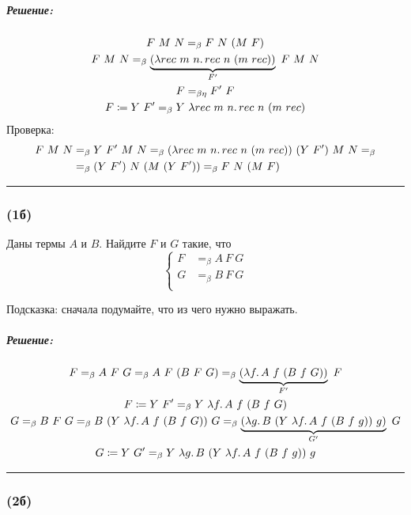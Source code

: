 \documentclass{article}
\newenvironment{proof}{\subparagraph{\hspace{-1em}Решение:\newline}\-}{\par\noindent\rule{\textwidth}{0.4pt}}
\newcommand{\eqbeta}{=_\beta}
\newcommand{\eqbetaeta}{=_{\beta\eta}}
\begin{document}
    \begin{proof}
        \begin{gather}
            F~M~N \eqbeta F~N~(M~F) \\
            F~M~N \eqbeta \underbrace{(\lambda rec~m~n\ldotp rec~n~(m~rec))}_{F'}~F~M~N \\
            F \eqbetaeta F'~F \\
            F \coloneqq Y~F' \eqbeta Y~\lambda rec~m~n\ldotp rec~n~(m~rec)
        \end{gather}
        Проверка:
        \begin{align}
            F~M~N & \eqbeta Y~F'~M~N \eqbeta (\lambda rec~m~n\ldotp rec~n~(m~rec))~(Y~F')~M~N \eqbeta \\
                  & \eqbeta (Y~F')~N~(M~(Y~F')) \eqbeta F~N~(M~F)
        \end{align}
    \end{proof}

    \subsubsection{(1б)}

    Даны термы $A$ и $B$.
    Найдите $F$ и $G$ такие, что
    \[
        \left\{
        \begin{aligned}
            F &\eqbeta A~F~G \\
            G &\eqbeta B~F~G \\
        \end{aligned}\right.
    \]

    Подсказка: сначала подумайте, что из чего нужно выражать.

    \begin{proof}
        \begin{gather}
            F \eqbeta A~F~G \eqbeta A~F~(B~F~G) \eqbeta \underbrace{(\lambda f\ldotp A~f~(B~f~G))}_{F'}~F \\
            F \coloneqq Y~F' \eqbeta Y~\lambda f\ldotp A~f~(B~f~G) \\
            G \eqbeta B~F~G \eqbeta B~(Y~\lambda f\ldotp A~f~(B~f~G))~G \eqbeta \underbrace{(\lambda g\ldotp B~(Y~\lambda f\ldotp A~f~(B~f~g))~g)}_{G'}~G \\
            G \coloneqq Y~G' \eqbeta Y~\lambda g\ldotp B~(Y~\lambda f\ldotp A~f~(B~f~g))~g
        \end{gather}
    \end{proof}

    \subsubsection{(2б)}
\end{document}
